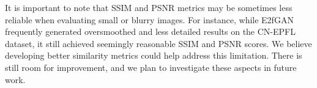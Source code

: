It is important to note that SSIM and PSNR metrics may be sometimes less reliable when evaluating small or blurry images. 
For instance, while E2fGAN frequently generated oversmoothed and less detailed results on the CN-EPFL dataset, it still achieved seemingly reasonable SSIM and PSNR scores. 
We believe developing better similarity metrics could help address this limitation. There is still room for improvement, and we plan to investigate these aspects in future work.